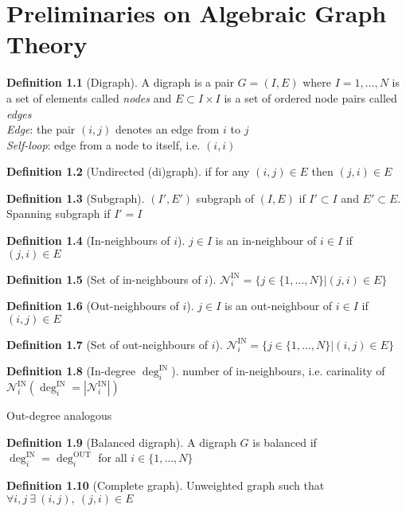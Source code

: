 \documentclass{book}
\theoremstyle{definition}
\newtheorem{definition}{Definition}[section]
\theoremstyle{remark}
\theoremstyle{remark}
\theoremstyle{definition}
\begin{document}
\chapter{Preliminaries on Algebraic Graph Theory}
\begin{definition}[Digraph]
    A digraph is a pair $G=(I,E)$ where $I={1,\dots,N}$ is a set of elements called \emph{nodes} and $E\subset I \times I$ is a set of ordered node pairs called \emph{edges}\\
    \emph{Edge}: the pair $(i,j)$ denotes an edge from $i$ to $j$\\ 
    \emph{Self-loop}: edge from a node to itself, i.e. $(i,i)$
\end{definition}
\begin{definition}[Undirected (di)graph]
    if for any $(i,j)\in E$ then $(j,i)\in E$  
\end{definition}
\begin{definition}[Subgraph]
    $(I',E')$ subgraph of $(I,E)$ if $I'\subset I$ and $E' \subset E$. Spanning subgraph if $I'=I$
\end{definition}
\begin{definition}[In-neighbours of $i$]$j\in I$ is an in-neighbour of $i\in I$ if $(j,i)\in E$
\end{definition}
\begin{definition}[Set of in-neighbours of $i$]
    $\mathcal{N}_i^{\text{IN}}=\{j\in\{1,\dots,N\}|(j,i)\in E\}$
\end{definition}
\begin{definition}[Out-neighbours of $i$]$j\in I$ is an out-neighbour of $i\in I$ if $(i,j)\in E$
\end{definition}
\begin{definition}[Set of out-neighbours of $i$]
    $\mathcal{N}_i^{\text{IN}}=\{j\in\{1,\dots,N\}|(i,j)\in E\}$
\end{definition}
\begin{definition}[In-degree $\deg_i^{\text{IN}}$]
    number of in-neighbours, i.e. carinality of $\mathcal{N}_i^{\text{IN}}(\deg_i^{\text{IN}}=|\mathcal{N}_i^{\text{IN}}|)$

    Out-degree analogous
\end{definition}
\begin{definition}[Balanced digraph]
    A digraph $G$ is balanced if $\deg_i^{\text{IN}}=\deg_i^{\text{OUT}}$ for all $i\in\{1,\dots,N\}$
\end{definition}

\begin{definition}[Complete graph]
    Unweighted graph such that $\forall i,j\ \exists \ (i,j),\ (j,i) \in E$
\end{definition}
\end{document}
